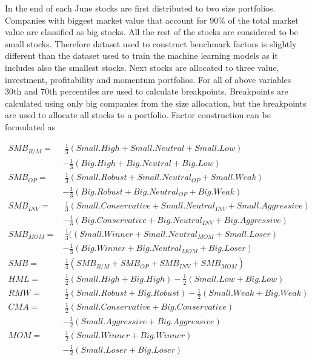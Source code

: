 \documentclass{article}
\begin{document}
In the end of each June stocks are first distributed to two size portfolios. Companies with biggest market value that account for $90\%$ of the total market value are classified as big stocks. All the rest of the stocks are considered to be small stocks. Therefore dataset used to construct benchmark factors is slightly different than the dataset used to train the machine learning models as it includes also the smallest stocks. Next stocks are allocated to three value, investment, profitability and momentum portfolios. For all of above variables 30th and 70th percentiles are used to calculate breakpoints. Breakpoints are calculated using only big companies from the size allocation, but the breakpoints are used to allocate all stocks to a portfolio. Factor construction can be formulated as \par

\begin{equation} \label{eq:FF6factors}
\begin{split}
SMB_{B/M} = & \ \frac{1}{3} (Small.High + Small.Neutral + Small.Low) \\
			& - \frac{1}{3} (Big.High + Big.Neutral + Big.Low) \\[5pt]
SMB_{OP} = & \ \frac{1}{3} (Small.Robust + Small.Neutral_{OP} + Small.Weak)\\
			& - \frac{1}{3} (Big.Robust + Big.Neutral_{OP} + Big.Weak)\\[5pt]
SMB_{INV} = & \ \frac{1}{3} (Small.Conservative + Small.Neutral_{INV} + Small.Aggressive)\\
			& - \frac{1}{3} (Big.Conservative + Big.Neutral_{INV} + Big.Aggressive)\\[5pt]
SMB_{MOM} = & \ \frac{1}{3} ((Small.Winner + Small.Neutral_{MOM} + Small.Loser)\\
		     	& - \frac{1}{3} (Big.Winner + Big.Neutral_{MOM} + Big.Loser)\\[5pt]
SMB = & \ \frac{1}{4} (SMB_{B/M} + SMB_{OP} + SMB_{INV} + SMB_{MOM})\\[20pt]
HML = & \ \frac{1}{2} (Small.High + Big.High) - \frac{1}{2} (Small.Low + Big.Low)\\[5pt]
RMW = & \ \frac{1}{2} (Small.Robust + Big.Robust) - \frac{1}{2} (Small.Weak + Big.Weak)\\[5pt]
CMA = & \ \frac{1}{2} (Small.Conservative + Big.Conservative)\\
		& - \frac{1}{2} (Small.Aggressive + Big.Aggressive)\\[5pt]
MOM = & \ \frac{1}{2} (Small.Winner + Big.Winner)\\
		& - \frac{1}{2} (Small.Loser + Big.Loser)\\
\end{split}
\end{equation}
\end{document}
